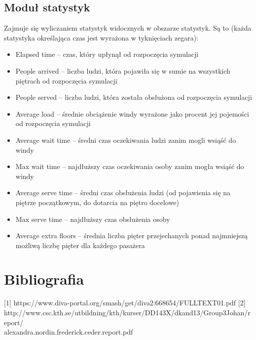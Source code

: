 \documentclass[a4paper,11pt]{article}
\begin{document}
\subsection{Moduł statystyk}
Zajmuje się wyliczaniem statystyk widocznych w obszarze statystyk. Są to (każda statystyka określająca czas jest wyrażona w tyknięciach zegara):
\begin{itemize}
	\item Elapsed time -- czas, który upłynął od rozpoczęcia symulacji
	\item People arrived -- liczba ludzi, która pojawiła się w sumie na wszystkich piętrach od rozpoczęcia symulacji
	\item People served -- liczba ludzi, która została obsłużona od rozpoczęcia symulacji
	\item Average load -- średnie obciążenie windy wyrażone jako procent jej pojemości od rozpoczęcia symulacji
	\item Average wait time -- średni czas oczekiwania ludzi zanim mogli wsiąść do windy
	\item Max wait time -- najdłuższy czas oczekiwania osoby zanim mogła wsiąść do windy
	\item Average serve time -- średni czas obsłużenia ludzi (od pojawienia się na piętrze początkowym, do dotarcia na piętro docelowe)
	\item Max serve time -- najdłuższy czas obsłużenia osoby
	\item Average extra floors -- średnia liczba pięter przejechanych ponad najmniejszą możliwą liczbę pięter dla każdego pasażera
\end{itemize}

\section{Bibliografia}
[1] https://www.diva-portal.org/smash/get/diva2:668654/FULLTEXT01.pdf
[2] http://www.csc.kth.se/utbildning/kth/kurser/DD143X/dkand13/Group3Johan/report/\\
\indent alexandra.nordin.frederick.ceder.report.pdf
\end{document}
